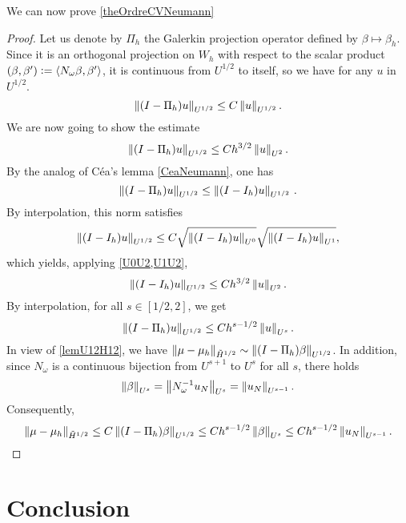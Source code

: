\documentclass[a4paper]{article}
\begin{document}
\noindent We can now prove \autoref{theOrdreCVNeumann}
\begin{proof}
	Let us denote by $\Pi_h$ the Galerkin projection operator defined by $\beta \mapsto \beta_h$. Since it is an orthogonal projection on $W_h$ with respect to the scalar product $(\beta,\beta') \mathrel{\mathop:}= \left\langle N_\omega \beta,\beta'\right\rangle$, it is continuous from $U^{1/2}$ to itself, so we have for any $u$ in $U^{1/2}$. 
	\[\left\|(I - \Pi_h)u\right\|_{U^{1/2}} \leq C \left\|u\right\|_{U^{1/2}}.\]
	We are now going to show the estimate
	\[\left\|(I - \Pi_h)u\right\|_{U^{1/2}} \leq C h^{3/2} \left\|u\right\|_{U^{2}}.\]
	By the analog of Céa's lemma \autoref{CeaNeumann}, one has 
	\[\left\|(I-\Pi_h)u\right\|_{U^{1/2}} \leq \left\|(I - I_h) u\right\|_{U^{1/2}}\,.\] 
	By interpolation, this norm satisfies
	\[\left\|(I - I_h)u\right\|_{U^{1/2}} \leq C \sqrt{\left\|(I - I_h)u\right\|_{U^{0}}}\sqrt{\left\|(I - I_h)u\right\|_{U^{1}}},\]
	which yields, applying \autoref{U0U2,U1U2},
	\[\left\|(I - I_h)u\right\|_{U^{1/2}} \leq C h^{3/2} \left\|u\right\|_{U^2}.\]
	By interpolation, for all $s \in [1/2,2]$, we get
	\[\left\|(I - \Pi_h)u\right\|_{U^{1/2}} \leq C h^{s - 1/2} \left\|u\right\|_{U^s}.\]
	In view of \autoref{lemU12H12}, we have $\left\|\mu - \mu_h\right\|_{\tilde{H}^{1/2}} \sim \left\|(I - \Pi_h)\beta\right\|_{U^{1/2}}$. In addition, since $N_\omega$ is a continuous bijection from $U^{s+1}$ to $U^s$ for all $s$, there holds
	\[\left\|\beta\right\|_{U^s} = \left\|N_\omega^{-1} u_N\right\|_{U^s} = \left\|u_N\right\|_{U^{s-1}}.\]
	Consequently, 
	\[\left\|\mu - \mu_h\right\|_{\tilde{H}^{1/2}} \leq  C\left\|(I - \Pi_h)\beta\right\|_{U^{1/2}} \leq C h^{s - 1/2} \left\|\beta\right\|_{U^s} \leq C h^{s - 1/2} \left\|u_N\right\|_{U^{s-1}}.\]
\end{proof}


\section{Conclusion}
\end{document}
